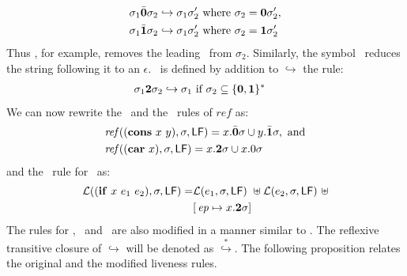\documentclass[9pt]{sigplanconf}
\begin{document}
\begin{align*}
  &\sigma_1\bar{\mathbf{0}}\sigma_2  \hookrightarrow
  \sigma_1\sigma_2'\mbox{ where } \sigma_2 = \mathbf{0}\sigma_2',\\
&\sigma_1\bar{\mathbf{1}}\sigma_2  \hookrightarrow
  \sigma_1\sigma_2'\mbox{ where } \sigma_2 =
  \mathbf{1}\sigma_2'
\end{align*}
Thus \bcar, for example, removes the leading \acar\ from $\sigma_2$.
Similarly, the symbol \clazy\ reduces the string following it to an
$\epsilon$. \clazy\  is defined by addition to
$\hookrightarrow$ the rule:
\begin{align*}
  &\sigma_1{\mathbf{2}}\sigma_2  \hookrightarrow
  \sigma_1 \mbox{ if } \sigma_2 \subseteq  \{\mathbf{0},\mathbf{1}\}^\ast
\end{align*}
We can  now rewrite the \CONS\  and the \CAR\  rules of $\mathit{ref}$
as:
\begin{align*}
&\mathit{ref\/}((\mbox{$\mathbf{cons}$}~x~y),\sigma,\mathsf{LF})
= x.\bar{\mathbf{0}}\sigma \cup y.\bar{\mathbf{1}}\sigma  \label{eqn:mod-cons},~
\mbox{and} \\
&\mathit{ref\/}((\mbox{$\mathbf{car}$}~x),\sigma,\mathsf{LF})
          =   x.{\mathbf{2}}\sigma \cup x.0\sigma
\end{align*}
and the \Lfunonly\ rule
for \SIF\ as:
\begin{align*}
\mathcal{L}((\mbox{$\mathbf{ if}$}~x~e_1~e_2),\sigma,\mathsf{LF}) =
                    &\mathcal{L}(e_1,\sigma,\mathsf{LF})~\uplus
        \mathcal{L}(e_2,\sigma,\mathsf{LF})~\uplus\\
        &[\,\mathit{ep} \mapsto  x.{\mathbf{2}} \sigma]
\end{align*}
The rules for  \CDR, \PRIM\ and \NULLQ\ are also  modified in a manner
similar to \CAR.  %
The reflexive  transitive closure of  $\hookrightarrow$ will
be   denoted    as   $\stackrel{*}{\hookrightarrow}$.    The
following proposition relates  the original and the modified
liveness rules.
\end{document}

